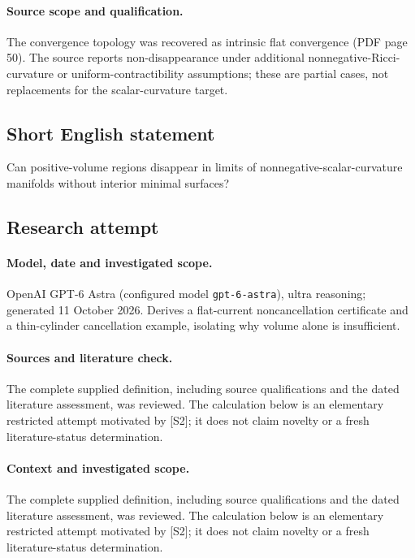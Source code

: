 \documentclass[11pt]{article}
\begin{document}
\paragraph{Source scope and qualification.}
The convergence topology was recovered as intrinsic flat convergence (PDF page 50). The source reports non-disappearance under additional nonnegative-Ricci-curvature or uniform-contractibility assumptions; these are partial cases, not replacements for the scalar-curvature target.
\subsection{Short English statement}
Can positive-volume regions disappear in limits of nonnegative-scalar-curvature manifolds without interior minimal surfaces?
\subsection{Research attempt}
\paragraph{Model, date and investigated scope.}
OpenAI GPT-6 Astra (configured model \texttt{gpt-6-astra}), ultra reasoning; generated 11 October 2026. Derives a flat-current noncancellation certificate and a thin-cylinder cancellation example, isolating why volume alone is insufficient.

\paragraph{Sources and literature check.}
The complete supplied definition, including source qualifications and the dated literature assessment, was reviewed. The calculation below is an elementary restricted attempt motivated by [S2]; it does not claim novelty or a fresh literature-status determination.

\paragraph{Context and investigated scope.} The complete supplied definition, including source qualifications and the dated literature assessment, was reviewed. The calculation below is an elementary restricted attempt motivated by [S2]; it does not claim novelty or a fresh literature-status determination.
\end{document}
